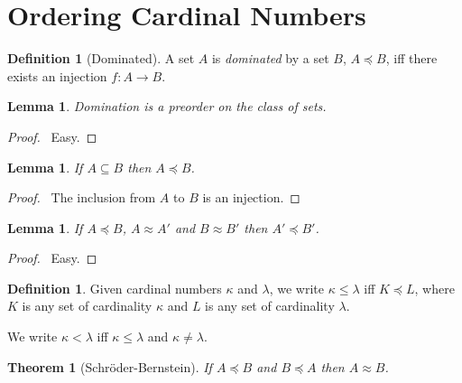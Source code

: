 \documentclass{article}
\let\qed\relax
\newtheorem{lemma}[axiom]{Lemma}
\newtheorem{theorem}[axiom]{Theorem}
\theoremstyle{definition}
\newtheorem{definition}[axiom]{Definition}
\begin{document}
    \section{Ordering Cardinal Numbers}

    \begin{definition}[Dominated]
        A set $A$ is \emph{dominated} by a set $B$, $A \preccurlyeq B$, iff there exists an injection
        $f : A \rightarrow B$.
    \end{definition}

    \begin{lemma}
        Domination is a preorder on the class of sets.
    \end{lemma}

    \begin{proof}
        \pf\ Easy. \qed
    \end{proof}

    \begin{lemma}
        If $A \subseteq B$ then $A \preccurlyeq B$.
    \end{lemma}

    \begin{proof}
        \pf\ The inclusion from $A$ to $B$ is an injection. \qed
    \end{proof}

    \begin{lemma}
        If $A \preccurlyeq B$, $A \approx A'$ and $B \approx B'$ then $A' \preccurlyeq B'$.
    \end{lemma}
    
    \begin{proof}
        \pf\ Easy. \qed
    \end{proof}

    \begin{definition}
        Given cardinal numbers $\kappa$ and $\lambda$, we write $\kappa \leq \lambda$ iff
        $K \preccurlyeq L$, where $K$ is any set of cardinality $\kappa$ and $L$ is any set of
        cardinality $\lambda$.

        We write $\kappa < \lambda$ iff $\kappa \leq \lambda$ and $\kappa \neq \lambda$.
    \end{definition}

    \begin{theorem}[Schr\"{o}der-Bernstein]
        If $A \preccurlyeq B$ and $B \preccurlyeq A$ then $A \approx B$.
    \end{theorem}
\end{document}
